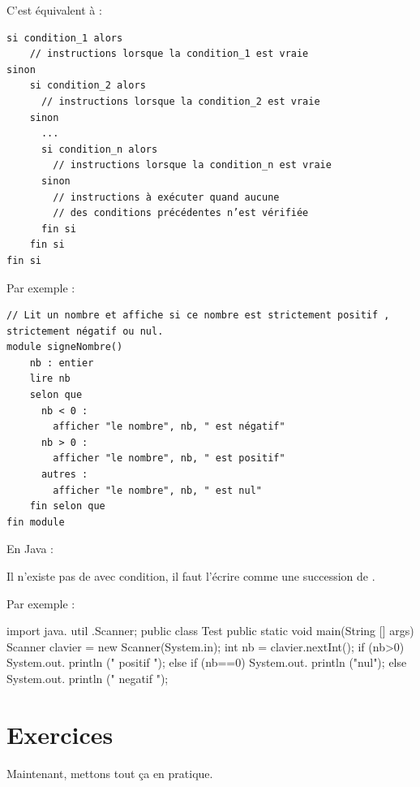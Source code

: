 \documentclass[11pt,a4paper]{article}
\begin{document}
            \par
        C'est \'equivalent \`a : 
            \par
        \begin{verbatim}
si condition_1 alors
    // instructions lorsque la condition_1 est vraie
sinon
    si condition_2 alors
      // instructions lorsque la condition_2 est vraie
    sinon
      ...
      si condition_n alors
        // instructions lorsque la condition_n est vraie
      sinon
        // instructions à exécuter quand aucune
        // des conditions précédentes n’est vérifiée
      fin si
    fin si
fin si
      \end{verbatim}Par exemple : 
            \par
        \begin{verbatim}
// Lit un nombre et affiche si ce nombre est strictement positif , strictement négatif ou nul.
module signeNombre()
    nb : entier
    lire nb
    selon que 
      nb < 0 :
        afficher "le nombre", nb, " est négatif"
      nb > 0 :
        afficher "le nombre", nb, " est positif"
      autres : 
        afficher "le nombre", nb, " est nul"
    fin selon que
fin module
    \end{verbatim}En Java :
            \par
        Il n'existe pas de \verb@switch@ avec condition, 
		  il faut l'\'ecrire comme une succession de \verb@if@.
            \par
        \begin{Java}
if (condition_1){
      // instructions lorsque la condition_1 est vraie
} else if (condition_2){
      // instructions lorsque la condition_2 est vraie
} ... 
} else if (condition_n){
      // instructions lorsque la condition_n est vraie
} else {
      // instructions a executer quand aucune
      // des conditions precedentes n est verifiee
}
      \end{Java}Par exemple : 
            \par
        \begin{Java}
import java. util .Scanner;
public class Test {
    public static void main(String [] args) {
      Scanner clavier = new Scanner(System.in);
      int nb = clavier.nextInt();
      if (nb>0) {
        System.out. println (" positif ");
      } else if (nb==0) {
        System.out. println ("nul");
      } else {
        System.out. println (" negatif ");
      }
    }
}
    \end{Java}\section{Exercices}
				Maintenant, mettons tout \c ca en pratique.
      
\end{document}

